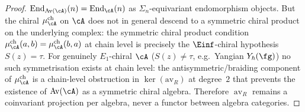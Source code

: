 \begin{proof}
$\operatorname{End}_{\mathrm{Av}(\cA)}(n) =
\operatorname{End}_\cA(n)$ as $\Sigma_n$-equivariant
endomorphism objects. But the chiral $\mu^{\mathrm{ch}}_\cA$ on
$\cA$ does not in general descend to a symmetric chiral product
on the underlying complex: the symmetric chiral product
condition $\mu^{\mathrm{ch}}_{\cA}(a,b) =
\mu^{\mathrm{ch}}_\cA(b,a)$ at chain level is precisely
the $\Einf$-chiral hypothesis $S(z)=\tau$. For genuinely
$E_1$-chiral $\cA$ \textup{(}$S(z)\neq\tau$, e.g.\ Yangian
$Y_\hbar(\fg)$\textup{)} no such symmetrisation exists at chain
level: the antisymmetric/braiding component of
$\mu^{\mathrm{ch}}_\cA$ is a chain-level obstruction in
$\ker(\mathrm{av}_R)$ at degree~$2$ that prevents the existence
of $\mathrm{Av}(\cA)$ as a symmetric chiral algebra. Therefore
$\operatorname{av}_R$ remains a coinvariant projection per
algebra, never a functor between algebra categories. \qedhere
\end{proof}

